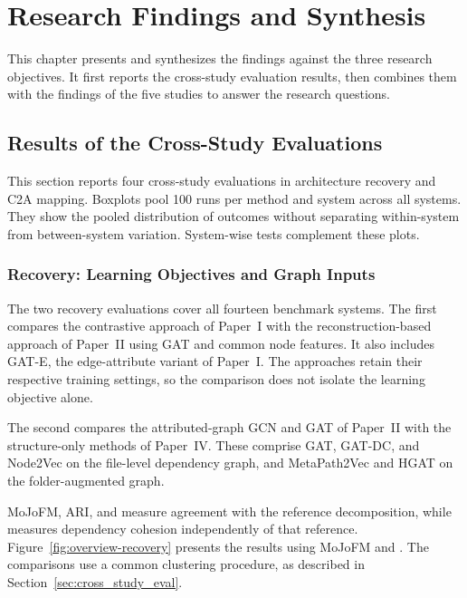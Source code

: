 \chapter{Research Findings and Synthesis \label{ch:findings}}
\chaptertoc

This chapter presents and synthesizes the findings against the three research objectives. It first reports the cross-study evaluation results, then combines them with the findings of the five studies to answer the research questions.

\section{Results of the Cross-Study Evaluations\label{sec:cross_study_results}}

This section reports four cross-study evaluations in architecture recovery and C2A mapping. Boxplots pool 100 runs per method and system across all systems. They show the pooled distribution of outcomes without separating within-system from between-system variation. System-wise tests complement these plots.

\subsection{Recovery: Learning Objectives and Graph Inputs \label{sec:cont_recon}\label{sec:recovery_cross_study}}

The two recovery evaluations cover all fourteen benchmark systems. The first compares the contrastive approach of Paper~I with the reconstruction-based approach of Paper~II using GAT and common node features. It also includes GAT-E, the edge-attribute variant of Paper~I. The approaches retain their respective training settings, so the comparison does not isolate the learning objective alone.

The second compares the attributed-graph GCN and GAT of Paper~II with the structure-only methods of Paper~IV. These comprise GAT, GAT-DC, and Node2Vec on the file-level dependency graph, and MetaPath2Vec and HGAT on the folder-augmented graph.

MoJoFM, ARI, and \cc{} measure agreement with the reference decomposition, while \tmq{} measures dependency cohesion independently of that reference. Figure~\ref{fig:overview-recovery} presents the results using MoJoFM and \tmq{}. The comparisons use a common clustering procedure, as described in Section~\ref{sec:cross_study_eval}.


